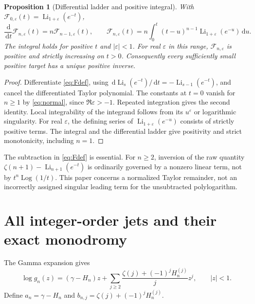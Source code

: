 \documentclass[11pt,a4paper]{article}
\numberwithin{equation}{section}
\newtheorem{proposition}[theorem]{Proposition}
\theoremstyle{definition}\newtheorem{definition}[theorem]{Definition}
\theoremstyle{remark}\newtheorem{remark}[theorem]{Remark}
\DeclareMathOperator{\Li}{Li}
\DeclareMathOperator{\Log}{Log}
\newcommand{\dd}{\,\mathrm d}\newcommand{\eps}{\varepsilon}
\newcommand{\F}{\mathcal F}\newcommand{\B}{\mathcal B}
\begin{document}
\begin{proposition}[Differential ladder and positive integral]\label{prop:ladder}
With $\F_{0,\eps}(t)=\Li_{1+\eps}(e^{-t})$,
\begin{equation}\label{eq:ladder}
 \frac{\dd}{\dd t}\F_{n,\eps}(t)=n\F_{n-1,\eps}(t),\qquad
 \F_{n,\eps}(t)=n\int_0^t(t-u)^{n-1}\Li_{1+\eps}(e^{-u})\dd u.
\end{equation}
The integral holds for positive $t$ and $|\eps|<1$. For real $\eps$ in
this range, $\F_{n,\eps}$ is positive and strictly increasing on $t>0$.
Consequently every sufficiently small positive target has a unique
positive inverse.
\end{proposition}
\begin{proof}
Differentiate \eqref{eq:Fdef}, using
$\dd\Li_s(e^{-t})/\dd t=-\Li_{s-1}(e^{-t})$, and cancel the differentiated
Taylor polynomial. The constants at $t=0$ vanish for $n\ge1$ by
\eqref{eq:normal}, since $\Re\eps>-1$. Repeated integration gives the
second identity. Local integrability of the integrand follows from its
$u^{\eps}$ or logarithmic singularity. For real $\eps$, the defining
series of $\Li_{1+\eps}(e^{-u})$ consists of strictly positive terms.
The integral and the differential ladder give positivity and strict
monotonicity, including $n=1$.
\end{proof}

The subtraction in \eqref{eq:Fdef} is essential. For $n\ge2$, inversion of
the raw quantity $\zeta(n+1)-\Li_{n+1}(e^{-t})$ is ordinarily governed by a
nonzero linear term, not by $t^n\Log(1/t)$. This paper concerns a normalized
Taylor remainder, not an incorrectly assigned singular leading term for
the unsubtracted polylogarithm.

\section{All integer-order jets and their exact monodromy}
\label{sec:jets}
The Gamma expansion gives
\begin{equation}\label{eq:logg}
 \log g_n(z)=(\gamma-H_n)z+
 \sum_{j\ge2}\frac{\zeta(j)+(-1)^jH_n^{(j)}}j z^j,
 \qquad |z|<1.
\end{equation}
Define $a_n=\gamma-H_n$ and $b_{n,j}=\zeta(j)+(-1)^jH_n^{(j)}$.
\end{document}
